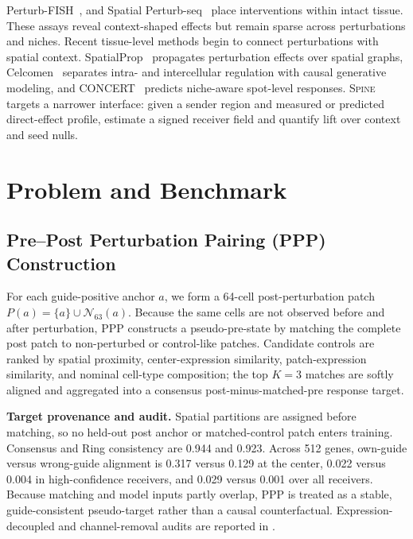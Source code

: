 \documentclass[sigconf,review,balance=false]{acmart}
\newcommand{\methodname}{\textsc{Spine}\xspace}
\newcommand{\ppp}{\textsc{PPP}\xspace}
\begin{document}
Perturb-FISH~\citep{binan2025perturbfish}, and Spatial
Perturb-seq~\citep{shen2026spatialperturbseq} place interventions within intact
tissue. These assays reveal context-shaped effects but remain sparse across
perturbations and niches.
Recent tissue-level methods begin to connect perturbations with spatial context.
SpatialProp~\citep{spatialprop2025} propagates perturbation effects over spatial
graphs, Celcomen~\citep{celcomen2026} separates intra- and intercellular regulation
with causal generative modeling, and CONCERT~\citep{concert2025} predicts
niche-aware spot-level responses. \methodname{} targets a narrower interface:
given a sender region and measured or predicted direct-effect profile, estimate
a signed receiver field and quantify lift over context and seed nulls.








\section{Problem and Benchmark}
\label{sec:data_construction}
\subsection{Pre--Post Perturbation Pairing (PPP) Construction}
For each guide-positive anchor $a$, we form a 64-cell post-perturbation patch
$P(a)=\{a\}\cup\mathcal{N}_{63}(a)$. Because the same cells are not observed
before and after perturbation, \ppp constructs a pseudo-pre-state by matching
the complete post patch to non-perturbed or control-like patches. Candidate
controls are ranked by spatial proximity, center-expression similarity,
patch-expression similarity, and nominal cell-type composition; the top
$K=3$ matches are softly aligned and aggregated into a consensus
post-minus-matched-pre response target.

\textbf{Target provenance and audit.}
Spatial partitions are assigned before matching, so no held-out post anchor or
matched-control patch enters training. Consensus and Ring consistency are
0.944 and 0.923. Across 512 genes, own-guide versus wrong-guide alignment is
0.317 versus 0.129 at the center, 0.022 versus 0.004 in high-confidence
receivers, and 0.029 versus 0.001 over all receivers. Because matching and
model inputs partly overlap, \ppp is treated as a stable, guide-consistent
pseudo-target rather than a causal counterfactual. Expression-decoupled and
channel-removal audits are reported in .
\end{document}
